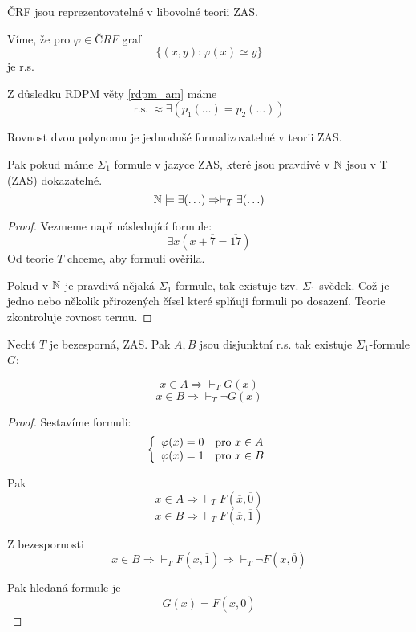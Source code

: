 \begin{observation}
	ČRF jsou reprezentovatelné v libovolné teorii ZAS.

	Víme, že pro $\varphi \in ČRF$ graf
	\[ \{ (x, y): \varphi(x) \simeq y \} \]
	je r.s.

	Z důsledku RDPM věty \cref{rdpm_am} máme
	\[ \text{r.s.}\ \approx \exists(p_1(\ldots) = p_2(\ldots)) \]

	Rovnost dvou polynomu je jednodušé formalizovatelné v teorii ZAS.

\end{observation}

\begin{theorem}
	Pak pokud máme $\Sigma_1$ formule v jazyce ZAS, které jsou pravdivé v $\operatorname{\mathbb{N}}$ jsou v T (ZAS) dokazatelné.
	\[ \operatorname{\mathbb{N}} \models \exists (\ldots) \Rightarrow \vdash_T \exists (\ldots) \]
\end{theorem}
\begin{proof}
	Vezmeme např následující formule:
	\[ \exists x (x + \overline{7} = \overline{17})\]
	Od teorie $T$ chceme, aby formuli ověřila.

	Pokud v $\operatorname{\mathbb{N}}$ je pravdivá nějaká $\Sigma_1$ formule, tak existuje tzv. $\Sigma_1$ svědek.
	Což je jedno nebo několik přirozených čísel které splňuji formuli po dosazení.
	Teorie zkontroluje rovnost termu.
\end{proof}

\begin{lemma}
	Nechť $T$ je bezesporná, ZAS.
	Pak $A, B$ jsou disjunktní r.s. tak existuje $\Sigma_1$-formule $G$:

	\[ x \in A \Rightarrow \vdash_T G(\overline{x}) \]
	\[ x \in B \Rightarrow \vdash_T \neg G(\overline{x}) \]
\end{lemma}
\begin{proof}
	Sestavíme formuli:
	\[ \left\{ \begin{array}{ll} \varphi(x) = 0 & \mbox{pro } x \in A \\ \varphi(x) = 1 & \mbox{pro } x \in B \end{array} \right. \]

	Pak
	\[ x \in A \Rightarrow \vdash_T F(\overline{x}, \overline{0}) \]
	\[ x \in B \Rightarrow \vdash_T F(\overline{x}, \overline{1}) \]

	Z bezespornosti
	\[ x \in B \Rightarrow \vdash_T F(\overline{x}, \overline{1}) \Rightarrow \vdash_T \neg F(\overline{x}, \overline{0}) \]

	Pak hledaná formule je
	\[ G(x) = F(x, \overline{0}) \]
\end{proof}


